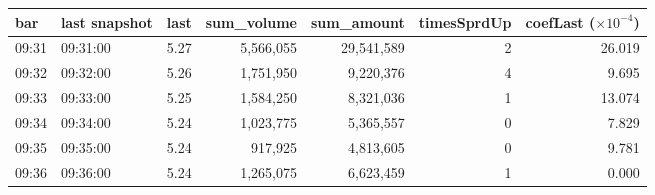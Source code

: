 \begin{tabular}{llrrrrr}
\toprule
bar & last snapshot & last & sum\_volume & sum\_amount & timesSprdUp & coefLast ($\times10^{-4}$) \\
\midrule
09:31 & 09:31:00 & 5.27 & 5{,}566{,}055 & 29{,}541{,}589 & 2 & 26.019 \\
09:32 & 09:32:00 & 5.26 & 1{,}751{,}950 & 9{,}220{,}376 & 4 & 9.695 \\
09:33 & 09:33:00 & 5.25 & 1{,}584{,}250 & 8{,}321{,}036 & 1 & 13.074 \\
09:34 & 09:34:00 & 5.24 & 1{,}023{,}775 & 5{,}365{,}557 & 0 & 7.829 \\
09:35 & 09:35:00 & 5.24 & 917{,}925 & 4{,}813{,}605 & 0 & 9.781 \\
09:36 & 09:36:00 & 5.24 & 1{,}265{,}075 & 6{,}623{,}459 & 1 & 0.000 \\
\bottomrule
\end{tabular}
